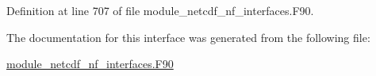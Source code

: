 Definition at line 707 of file module\+\_\+netcdf\+\_\+nf\+\_\+interfaces.\+F90.



The documentation for this interface was generated from the following file\+:\begin{DoxyCompactItemize}
\item 
\hyperlink{module__netcdf__nf__interfaces_8F90}{module\+\_\+netcdf\+\_\+nf\+\_\+interfaces.\+F90}\end{DoxyCompactItemize}
